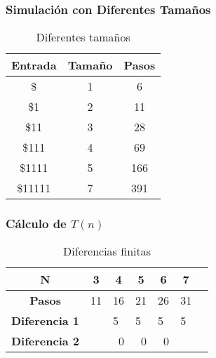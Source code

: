 \documentclass{uc3mpracticas}
\begin{document}
  \subsubsection{Simulación con Diferentes Tamaños}

  \begin{table}[!h]
    \centering
  \begin{tabular}{|c|c|c|}
  \hline
  \textbf{Entrada} & \textbf{Tamaño} & \textbf{Pasos} \\ \hline
  \$     & 1               & 6             \\ \hline
  \$1    & 2               & 11             \\ \hline
  \$11   & 3               & 28             \\ \hline
  \$111  & 4               & 69             \\ \hline
  \$1111 & 5               & 166             \\ \hline
  \$11111         & 7               & 391             \\ \hline
  \end{tabular}
  \caption{Diferentes tamaños}
  \end{table}


  \subsubsection{Cálculo de $T(n)$}


  \begin{table}[!h]
    \centering
  \begin{tabular}{|c|p{1cm}|p{1cm}|p{1cm}|p{1cm}|p{1cm}|p{1cm}|}
  \hline
  \textbf{N}     & \multicolumn{1}{c|}{\textbf{3}} & \multicolumn{1}{c|}{\textbf{4}} & \multicolumn{1}{c|}{\textbf{5}} & \multicolumn{1}{c|}{\textbf{6}} & \multicolumn{1}{c|}{\textbf{7}} \\ \hline
  \textbf{Pasos} & \multicolumn{1}{c|}{11}          & \multicolumn{1}{c|}{16}          & \multicolumn{1}{c|}{21}         & \multicolumn{1}{c|}{26}         & \multicolumn{1}{c|}{31} \\ \hline
  \textbf{Diferencia 1}                  &                                                         & 5                                                       & 5                               & 5                              &   5                           \\ \hline
  \textbf{Diferencia 2}                  &                                                         & \multicolumn{1}{r|}{0}                                  & \multicolumn{1}{r|}{0}          & \multicolumn{1}{r|}{0}       &                         \\ \hline
  \end{tabular}
  \caption{Diferencias finitas}
  \end{table}
\end{document}

